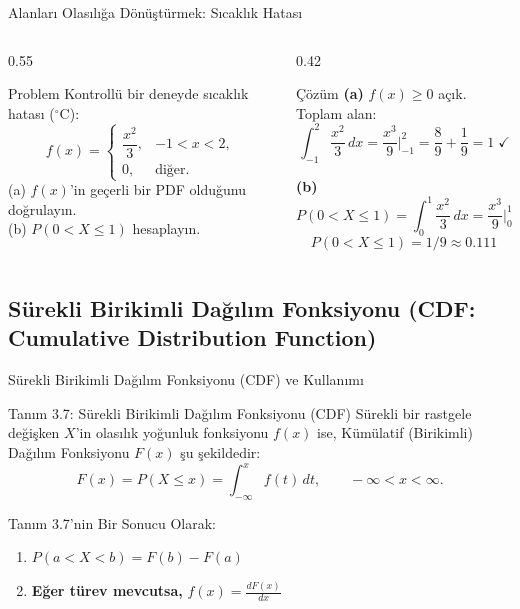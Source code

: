 \documentclass[light]{lutbeamer}
\begin{document}
\begin{frame}{Alanları Olasılığa Dönüştürmek: Sıcaklık Hatası}
\footnotesize
\begin{columns}[T]
  \begin{column}{0.55\textwidth}
    \begin{block}{Problem}
      Kontrollü bir deneyde sıcaklık hatası ($^\circ$C):
      \[
      f(x) =
      \begin{cases}
        \dfrac{x^2}{3}, & -1 < x < 2,\\[4pt]
        0, & \text{diğer}.
      \end{cases}
      \]
      (a) $f(x)$'in geçerli bir PDF olduğunu doğrulayın.\\
      (b) $P(0 < X \le 1)$ hesaplayın.
    \end{block}
  \end{column}
  \begin{column}{0.42\textwidth}
    \begin{alertblock}{Çözüm}
      \textbf{(a)} $f(x) \ge 0$ açık. Toplam alan:
      \[
      \int_{-1}^{2} \frac{x^2}{3}\,dx = \frac{x^3}{9}\bigg|_{-1}^{2} = \frac{8}{9} + \frac{1}{9} = 1 \;\checkmark
      \]

      \textbf{(b)}
      \[
      P(0 < X \le 1) = \int_{0}^{1} \frac{x^2}{3}\,dx = \frac{x^3}{9}\bigg|_{0}^{1} = \frac{1}{9}
      \]
      \[
      \boxed{P(0 < X \le 1) = 1/9 \approx 0.111}
      \]
    \end{alertblock}
  \end{column}
\end{columns}
\end{frame}

\subsection{Sürekli Birikimli Dağılım Fonksiyonu (CDF: Cumulative Distribution Function)}

\begin{frame}{Sürekli Birikimli Dağılım Fonksiyonu (CDF) ve Kullanımı}
\begin{block}{Tanım 3.7: Sürekli Birikimli Dağılım Fonksiyonu (CDF)}
  Sürekli bir rastgele değişken $X$'in olasılık yoğunluk fonksiyonu $f(x)$ ise, Kümülatif (Birikimli) Dağılım Fonksiyonu $F(x)$ şu şekildedir:
  \[
  F(x) = P(X \le x) = \int_{-\infty}^{x} f(t)\,dt, \qquad -\infty < x < \infty.
  \]
\end{block}

\begin{block}{Tanım 3.7'nin Bir Sonucu Olarak:}
  \begin{enumerate}
    \item $P(a < X < b) = F(b) - F(a)$
    \item \textbf{Eğer türev mevcutsa,} $f(x) = \frac{dF(x)}{dx}$
  \end{enumerate}
\end{block}
\end{frame}
\end{document}
